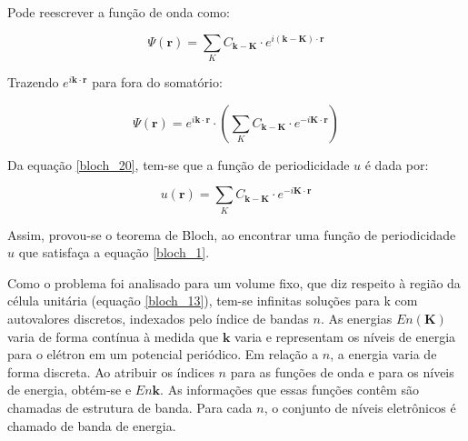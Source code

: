 	\par Pode reescrever a função de onda como:

	\begin{equation}
		\label{bloch_19}
		\Psi (\mathbf{r}) = \sum_{K} C_{\mathbf{k-K}}\cdot e^{i\mathbf{(k-K)}\cdot\mathbf{r}}
	\end{equation}

	\par Trazendo $e^{i\mathbf{k} \cdot \mathbf{r}}$ para fora do somatório:

	\begin{equation}
		\label{bloch_20}
		\Psi (\mathbf{r}) = e^{i\mathbf{k}\cdot\mathbf{r}} \cdot \left(\sum_{K} C_{\mathbf{k-K}}\cdot e^{-i \mathbf{K}\cdot\mathbf{r}}\right)
	\end{equation}

	\par Da equação \eqref{bloch_20}, tem-se que a função de periodicidade $u$ é dada por:

	\begin{equation}
		\label{bloch_21}
		u(\mathbf{r}) = \sum_{K} C_{\mathbf{k-K}}\cdot e^{-i \mathbf{K}\cdot\mathbf{r}}
	\end{equation}

	\par Assim, provou-se o teorema de Bloch, ao encontrar uma função de periodicidade $u$ que satisfaça a equação \eqref{bloch_1}.

	\par Como o problema foi analisado para um volume fixo, que diz respeito à região da célula unitária (equação \eqref{bloch_13}), tem-se infinitas soluções para k  com autovalores discretos, indexados pelo índice de bandas $n$. As energias $En(\mathbf{K})$ varia de forma contínua à medida que $\mathbf{k}$ varia e representam os níveis de energia para o elétron em um potencial periódico. Em relação a $n$, a energia varia de forma discreta. Ao atribuir os índices $n$ para as funções de onda e para os níveis de energia, obtém-se e $E n\mathbf{k}$. As informações que essas funções contêm são chamadas de estrutura de banda. Para cada $n$, o conjunto de níveis eletrônicos é chamado de banda de energia\cite{qm_fis5}. 

